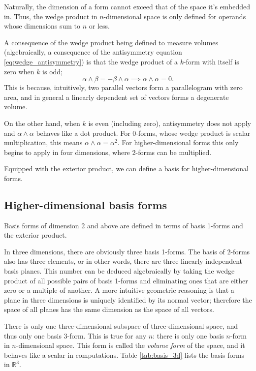 \documentclass[utf8,english]{gradu3}
\begin{document}
Naturally, the dimension of a form cannot exceed that of the space it's embedded in.
Thus, the wedge product in $n$-dimensional space
is only defined for operands whose dimensions sum to $n$ or less.

A consequence of the wedge product being defined to measure volumes
(algebraically, a consequence of the antisymmetry equation \eqref{eq:wedge_antisymmetry})
is that the wedge product of a $k$-form with itself is zero when $k$ is odd;
\[
  \alpha \wedge \beta = -\beta \wedge \alpha
  \implies \alpha \wedge \alpha = 0.
\]
This is because, intuitively, two parallel vectors
form a parallelogram with zero area,
and in general a linearly dependent set of vectors
forms a degenerate volume.

On the other hand, when $k$ is even (including zero),
antisymmetry does not apply and $\alpha \wedge \alpha$ behaves like a dot product.
For 0-forms, whose wedge product is scalar multiplication,
this means $\alpha \wedge \alpha = \alpha^2$.
For higher-dimensional forms this only begins to apply in four dimensions,
where 2-forms can be multiplied.

Equipped with the exterior product,
we can define a basis for higher-dimensional forms.

\subsection{Higher-dimensional basis forms}\label{sec:basis_higher}

Basis forms of dimension 2 and above
are defined in terms of basis 1-forms and the exterior product.

In three dimensions, there are obviously three basis 1-forms.
The basis of 2-forms also has three elements,
or in other words, there are three linearly independent basis planes.
This number can be deduced algebraically
by taking the wedge product of all possible pairs of basis 1-forms
and eliminating ones that are either zero or a multiple of another.
A more intuitive geometric reasoning is that 
a plane in three dimensions is uniquely identified by its normal vector;
therefore the space of all planes has the same dimension as the space of all vectors.

There is only one three-dimensional subspace of three-dimensional space,
and thus only one basis 3-form.
This is true for any $n$:
there is only one basis $n$-form in $n$-dimensional space.
This form is called the \textit{volume form} of the space,
and it behaves like a scalar in computations.
Table \ref{tab:basis_3d} lists the basis forms in $\mathbb{R}^3$.
\end{document}
